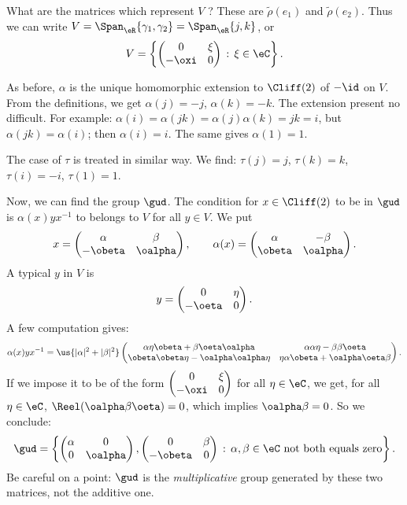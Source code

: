 What are the matrices which represent $V$ ? These are $\tilde\rho(e_1)$ and $\tilde\rho(e_2)$. Thus we can write $V=\Span_{\eR}\{\gamma_1,\gamma_2\}=\Span_{\eR}\{j,k\}$, or
\[
 V=\left\{\begin{pmatrix}
 0 & \xi \\
 -\oxi & 0
 \end{pmatrix}\,:\,\xi\in\eC\right\}.
\]

As before, $\alpha$ is the unique homomorphic extension to $\Cliff(2)$ of $-\id$ on $V$. From the definitions, we get $\alpha(j)=-j$, $\alpha(k)=-k$.
The extension present no difficult. For example: $\alpha(i)=\alpha(jk)=\alpha(j)\alpha(k)=jk=i$, but $\alpha(jk)=\alpha(i)$; then $\alpha(i)=i$. The same gives $\alpha(1)=1$.

The case of $\tau$ is treated in similar way. We find: $\tau(j)=j$, $\tau(k)=k$, $\tau(i)=-i$, $\tau(1)=1$.

Now, we can find the group $\gud$. The condition for $x\in\Cliff(2)$ to be in $\gud$ is $\alpha(x)yx^{-1}$ to belongs to $V$ for all $y\in V$. We put
\[ x=\begin{pmatrix}
\alpha & \beta \\
-\obeta & \oalpha
\end{pmatrix},\qquad\alpha(x)=\begin{pmatrix}
\alpha & -\beta \\
\obeta & \oalpha
\end{pmatrix}.\]
A typical $y$ in $V$ is
\[
 y=\begin{pmatrix}
 0 & \eta \\
 -\oeta & 0
 \end{pmatrix}.
\]
A few computation gives:
\[
 \alpha(x)yx^{-1}=\us{|\alpha|^2+|\beta|^2}\begin{pmatrix}
 \alpha\eta\obeta+\beta\oeta\oalpha & \alpha\alpha\eta-\beta\beta\oeta \\
 \obeta\obeta\eta-\oalpha\oalpha\eta & \eta\alpha\obeta+\oalpha\oeta\beta
 \end{pmatrix}.
\]
If we impose it to be of the form $\begin{pmatrix}
0 & \xi \\
-\oxi & 0
\end{pmatrix} $ for all $\eta\in\eC$, we get, for all $\eta\in\eC$, 
 $\Reel(\oalpha\beta\oeta)=0$, which implies $\oalpha\beta=0$. So we conclude:
\[
 \gud=\left\{\begin{pmatrix}
 \alpha & 0 \\
 0 & \oalpha
 \end{pmatrix}, \begin{pmatrix}
 0 & \beta \\
 -\obeta & 0
 \end{pmatrix}\,:\,\alpha,\beta\in\eC\textrm{ not both equals zero}\right\}.
\]
Be careful on a point: $\gud$ is the \emph{multiplicative} group generated by these two matrices, not the additive one.

